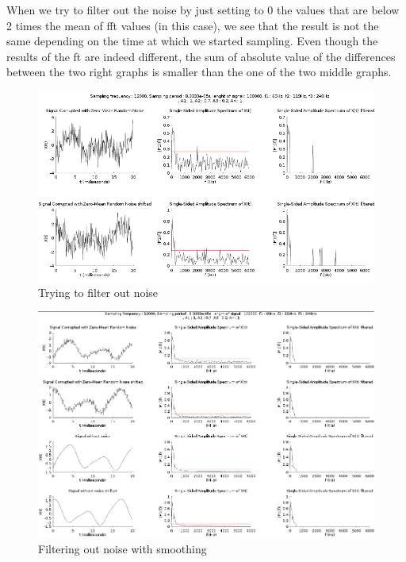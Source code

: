 When we try to filter out the noise by just setting to 0 the values that are below 2 times the mean of \acrshort{fft} values (in this case), we see that the result is not the same depending on the time at which we started sampling. Even though the results of the \acrshort{ft} are indeed different, the sum of absolute value of the differences between the two right graphs is smaller than the one of the two middle graphs.
\begin{figure}
    \centering
    \includegraphics[width=\textwidth]{img/unfiltered.png}
    \caption{Trying to filter out noise}
    \label{fig:unfiltered_signal}
\end{figure}
\begin{figure}
    \centering
    \includegraphics[trim={0 0 0 0.1cm},clip,height=0.99\textwidth, angle =90]{img/filter.png}
    \caption{Filtering out noise with smoothing}
    \label{fig:smooth_signal}
\end{figure}

